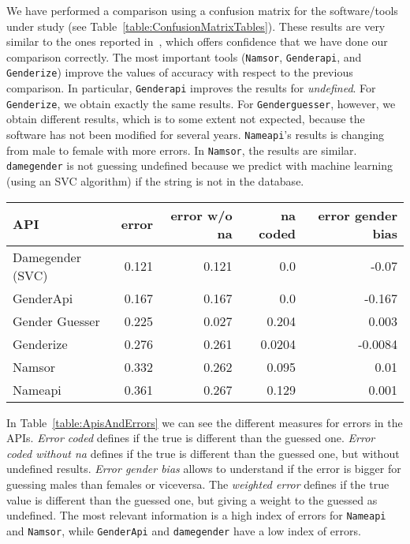 \documentclass[a4paper]{article}
\begin{document}
We have performed a comparison using a confusion matrix for the software/tools under study (see Table~\ref{table:ConfusionMatrixTables}).
These results are very similar to the ones reported in~\cite{10.7717/peerj-cs.156}, which offers confidence that we have done our comparison correctly.
The most important tools (\texttt{Namsor}, \texttt{Genderapi}, and \texttt{Genderize}) improve the values of accuracy with respect to the previous comparison.
In particular, \texttt{Genderapi} improves the results for \emph{undefined}.
For \texttt{Genderize}, we obtain exactly the same results. 
For \texttt{Genderguesser}, however, we obtain different results, which is to some extent not expected, because the software has not been modified for several years.
\texttt{Nameapi}'s results is changing from male to female with more errors. 
In \texttt{Namsor}, the results are similar. 
\texttt{damegender} is not guessing undefined because we predict with machine learning (using an SVC algorithm) if the string is not in the database.

\begin{table*}
\footnotesize
\center
\begin{tabular}[]{lrrrr}
\hline
API & error & error w/o na & na coded & error gender bias\tabularnewline
\hline
Damegender (SVC)\footnotemark[1] & 0.121 & 0.121 & 0.0 & -0.07\tabularnewline
GenderApi & 0.167 & 0.167 & 0.0 & -0.167\tabularnewline
Gender Guesser & 0.225 & 0.027 & 0.204 & 0.003\tabularnewline
Genderize & 0.276 & 0.261 & 0.0204 & -0.0084 \tabularnewline 
Namsor & 0.332 & 0.262 & 0.095 & 0.01 \tabularnewline
Nameapi & 0.361 & 0.267 & 0.129 & 0.001 \tabularnewline
\hline
\end{tabular}
\caption{APIs and Errors}
\vspace{0.3cm}
\label{table:ApisAndErrors}
\end{table*}


In Table~\ref{table:ApisAndErrors} we can see the different measures for errors in the APIs.
\emph{Error coded} defines if the true is different than the guessed one. 
\emph{Error coded without na} defines if the true is different than the guessed one, but without undefined results.
\emph{Error gender bias} allows to understand if the error is bigger for guessing males than females or viceversa.
The \emph{weighted error} defines if the true value is different than the guessed one, but giving a weight to the guessed as undefined.
The most relevant information is a high index of errors for \texttt{Nameapi} and \texttt{Namsor},
while \texttt{GenderApi} and \texttt{damegender} have a low index of errors.
\end{document}
